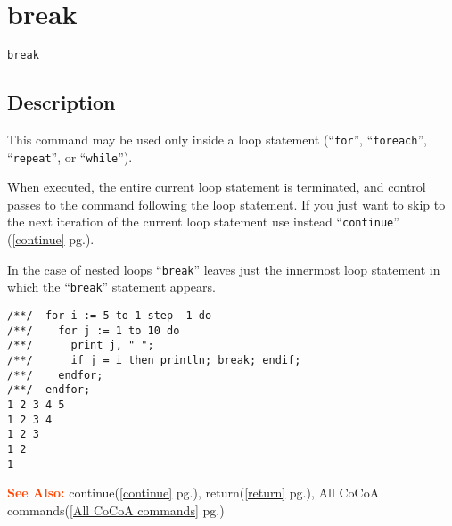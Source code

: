 \documentclass[a4paper]{mybook}
\newenvironment{command}{}{} %
\newcommand\SeeAlso{\par\textcolor{OrangeRed}{\textbf{\large See Also: }}}
\begin{document}
\section{break}
\label{break}
\begin{command} %


\begin{Verbatim}[label=syntax, rulecolor=\color{MidnightBlue},
frame=single]
break
\end{Verbatim}


\subsection*{Description}

This command may be used only inside a loop statement (``\verb&for&'', ``\verb&foreach&'',
``\verb&repeat&'', or ``\verb&while&'').
\par 
When executed, the entire current loop statement is terminated, and
control passes to the command following the loop statement.  If you
just want to skip to the next iteration of the current loop statement
use instead ``\verb&continue&'' (\ref{continue} pg.\pageref{continue}).
\par 
In the case of nested loops ``\verb&break&'' leaves just the innermost loop
statement in which the ``\verb&break&'' statement appears.
\begin{Verbatim}[label=example, rulecolor=\color{PineGreen}, frame=single]
/**/  for i := 5 to 1 step -1 do
/**/    for j := 1 to 10 do
/**/      print j, " ";
/**/      if j = i then println; break; endif;
/**/    endfor;
/**/  endfor;
1 2 3 4 5
1 2 3 4
1 2 3
1 2
1
\end{Verbatim}


\SeeAlso %
  continue(\ref{continue} pg.\pageref{continue}), 
    return(\ref{return} pg.\pageref{return}), 
    All CoCoA commands(\ref{All CoCoA commands} pg.\pageref{All CoCoA commands})
\end{command} %
\end{document}
